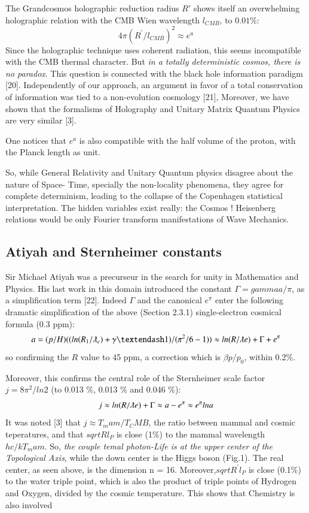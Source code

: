 \documentclass[twoside,draft]{article}
\begin{document}
\begin{sloppypar}
{The Grandcosmos holographic reduction radius $R\prime$ shows itself an overwhelming holographic
relation with the CMB Wien wavelength $l_{CMB}$, to $0.01\%$:
\begin{equation}
4\pi(R^{\prime}/l_{CMB})^{2} \approx e^{a}
\end{equation}
Since the holographic technique uses coherent radiation, this seems incompatible with the CMB
thermal character. But \textit{in a totally deterministic cosmos, there is no paradox}. This question is
connected with the black hole information paradigm [20]. Independently of our approach, an
argument in favor of a total conservation of information was tied to a non-evolution cosmology
[21], Moreover, we have shown that the formalisms of Holography and Unitary Matrix Quantum
Physics are very similar [3]. 

One notices that $e^{a}$ is also compatible with the half volume of the proton, with
the Planck length as unit.

So, while General Relativity and Unitary Quantum physics disagree about the nature of Space-
Time, specially the non-locality phenomena, they agree for complete determinism, leading to the collapse of the
Copenhagen statistical interpretation. The hidden variables exist really: the Cosmos ! Heisenberg
relations would be only Fourier transform manifestations of Wave Mechanics.


\subsection{Atiyah and Sternheimer constants}
    Sir Michael Atiyah was a precurseur in the search for unity in Mathematics and Physics. His last work in this domain introduced the constant $\Gamma = gamma a /\pi$, as a simplification term [22]. Indeed $\Gamma$ and the canonical $e^{\pi}$ enter the following dramatic simplification of the above (Section 2.3.1) single-electron cosmical formula (0.3 ppm):    
\begin{equation}
a = (p/H)((ln(R_1/\lambdabar_e) + \gamma – 1)/(\pi^2/6 - 1)) \approx ln(R/\lambdabar e) + \Gamma + e^{\pi}
\end{equation}
so confirming the $R$ value to 45 ppm, a correction which is $\beta p/p_0$, within 0.2\%.

Moreover, this confirms the central role of the Sternheimer scale factor $j = 8\pi^2/ln2$ (to 0.013 \%, 0.013 \% and 0.046 \%):
\begin{equation}
j \approx ln(R/\lambdabar e) + \Gamma \approx a - e^{\pi} \approx e^{\pi} lna
\end{equation}
It was noted [3] that $j\approx T_mam/T_CMB$, the ratio between mammal and cosmic teperatures, and that $sqrt{Rl_P}$ is close (1\%) to the mammal wavelength $hc/kT_mam$. So, \textit{the couple temal photon-Life is at the upper center of the Topological Axis}, while the down center is the Higgs boson (Fig.1). The real center, as seen above, is the dimension n = 16. Moreover,$sqrt{R^{\prime}l_P}$ is close (0.1\%) to the water triple point, which is also the product of triple points of Hydrogen and Oxygen, divided by the cosmic temperature. This shows that Chemistry is also involved

}
\end{sloppypar}
\end{document}

